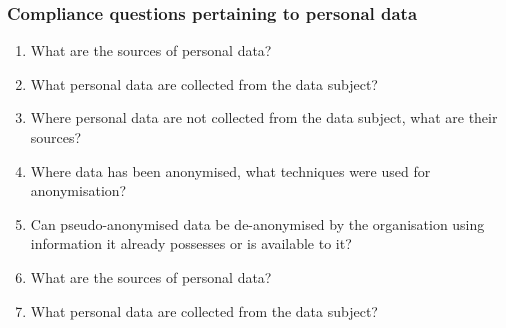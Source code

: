 \subsubsection{Compliance questions pertaining to personal data}
\begin{enumerate}[label={\textit{CMQ.\theenumi}},resume]
    \item What are the sources of personal data?
    \item What personal data are collected from the data subject?
    \item Where personal data are not collected from the data subject, what are their sources?
    \item Where data has been anonymised, what techniques were used for anonymisation?
    \item Can pseudo-anonymised data be de-anonymised by the organisation using information it already possesses or is available to it?
    \item What are the sources of personal data?
    \item What personal data are collected from the data subject?
\end{enumerate}

